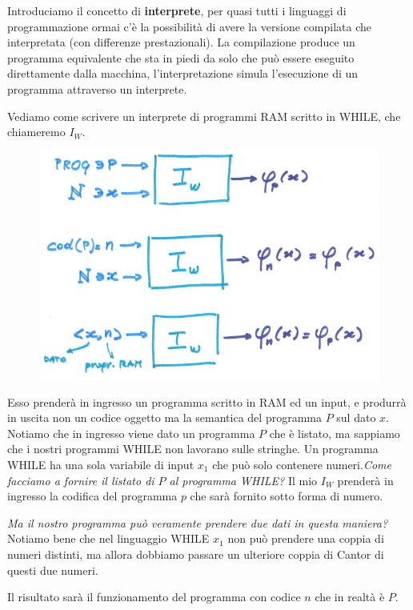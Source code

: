 \documentclass{article}
\begin{document}
Introduciamo il concetto di \textbf{interprete}, per quasi tutti i linguaggi di programmazione
ormai c'è la possibilità di avere la versione compilata che interpretata
(con differenze prestazionali).
La compilazione produce un programma equivalente che sta in piedi da solo
che può essere eseguito direttamente dalla macchina, l'interpretazione simula l'esecuzione
di un programma attraverso un interprete.

Vediamo come scrivere un interprete di programmi RAM scritto in WHILE, che chiameremo $I_W$.

\begin{figure}[H]
    \centering
    \includegraphics[scale=0.5]{images/interprete_while.png}
\end{figure}
Esso prenderà in ingresso un programma scritto in RAM ed un input, e produrrà in uscita
non un codice oggetto ma la semantica del programma $P$ sul dato $x$. Notiamo che in ingresso
viene dato un programma $P$ che è listato, ma sappiamo che i nostri programmi WHILE non lavorano
sulle stringhe. Un programma WHILE ha una sola variabile di input $x_1$ che può solo contenere
numeri.\textit{Come facciamo a fornire il listato di $P$ al programma WHILE?} Il mio $I_W$
prenderà in ingresso la codifica del programma $p$ che sarà fornito sotto forma di numero.

\textit{Ma il nostro programma può veramente prendere due dati in questa maniera?} Notiamo bene
che nel linguaggio WHILE $x_1$ non può prendere una coppia di numeri distinti, ma allora
dobbiamo passare un ulteriore coppia di Cantor di questi due numeri.

Il risultato sarà il funzionamento del programma con codice $n$ che in realtà è $P$.
\end{document}
